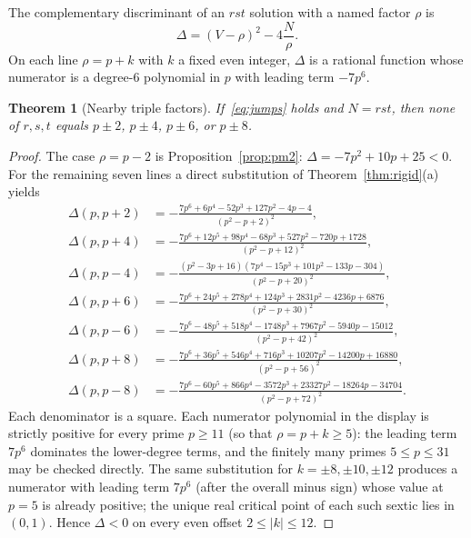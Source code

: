 \documentclass[11pt,reqno]{amsart}
\newtheorem{theorem}{Theorem}
\theoremstyle{definition}
\begin{document}
The complementary discriminant of an \(rst\) solution with a named factor \(\rho\) is
\[
\Delta=(V-\rho)^2-4\frac{N}{\rho}.
\]
On each line \(\rho=p+k\) with \(k\) a fixed even integer, \(\Delta\) is a rational function whose numerator is a degree-\(6\) polynomial in \(p\) with leading term \(-7p^6\).

\begin{theorem}[Nearby triple factors]
\label{thm:rst-off}
If~\eqref{eq:jumps} holds and \(N=rst\), then none of \(r,s,t\) equals \(p\pm 2\), \(p\pm 4\), \(p\pm 6\), or \(p\pm 8\).
\end{theorem}

\begin{proof}
The case \(\rho=p-2\) is Proposition~\ref{prop:pm2}: \(\Delta=-7p^2+10p+25<0\). For the remaining seven lines a direct substitution of Theorem~\ref{thm:rigid}(a) yields
\begin{align*}
\Delta(p,p+2)&=-\frac{7p^6+6p^4-52p^3+127p^2-4p-4}{(p^2-p+2)^2},\\
\Delta(p,p+4)&=-\frac{7p^6+12p^5+98p^4-68p^3+527p^2-720p+1728}{(p^2-p+12)^2},\\
\Delta(p,p-4)&=-\frac{(p^2-3p+16)(7p^4-15p^3+101p^2-133p-304)}{(p^2-p+20)^2},\\
\Delta(p,p+6)&=-\frac{7p^6+24p^5+278p^4+124p^3+2831p^2-4236p+6876}{(p^2-p+30)^2},\\
\Delta(p,p-6)&=-\frac{7p^6-48p^5+518p^4-1748p^3+7967p^2-5940p-15012}{(p^2-p+42)^2},\\
\Delta(p,p+8)&=-\frac{7p^6+36p^5+546p^4+716p^3+10207p^2-14200p+16880}{(p^2-p+56)^2},\\
\Delta(p,p-8)&=-\frac{7p^6-60p^5+866p^4-3572p^3+23327p^2-18264p-34704}{(p^2-p+72)^2}.
\end{align*}
Each denominator is a square. Each numerator polynomial in the display is strictly positive for every prime \(p\ge 11\) (so that \(\rho=p+k\ge 5\)): the leading term \(7p^6\) dominates the lower-degree terms, and the finitely many primes \(5\le p\le 31\) may be checked directly. The same substitution for \(k=\pm 8,\pm 10,\pm 12\) produces a numerator with leading term \(7p^6\) (after the overall minus sign) whose value at \(p=5\) is already positive; the unique real critical point of each such sextic lies in \((0,1)\). Hence \(\Delta<0\) on every even offset \(2\le |k|\le 12\).
\end{proof}
\end{document}
